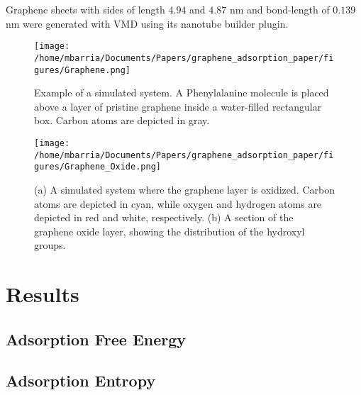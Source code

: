 \documentclass[twoside,twocolumn,9pt]{article}
\begin{document}
Graphene sheets with sides of length $4.94$ and $4.87$ nm and
bond-length of $0.139$ nm were generated with VMD\cite{Humphrey_1996}
using its nanotube builder plugin.

\begin{figure}[htbp]
\centerline{\texttt{[image: /home/mbarria/Documents/Papers/graphene\_adsorption\_paper/figures/Graphene.png]}}
\caption[]{\label{fig:system-pristine} Example of a simulated
  system. A Phenylalanine molecule is placed above a layer of pristine
  graphene inside a water-filled rectangular box. Carbon atoms are
  depicted in gray.}
\end{figure}

\begin{figure}[htbp]
\centerline{\texttt{[image: /home/mbarria/Documents/Papers/graphene\_adsorption\_paper/figures/Graphene\_Oxide.png]}}
\caption[]{\label{fig:system-oxide} (a) A simulated system where the
  graphene layer is oxidized. Carbon atoms are depicted in cyan, while
oxygen and hydrogen atoms are depicted in red and white,
respectively. (b) A section of the graphene oxide layer, showing the
distribution of the hydroxyl groups.}
\end{figure}







\section{Results}

\subsection{Adsorption Free Energy}

\subsection{Adsorption Entropy}
\end{document}
